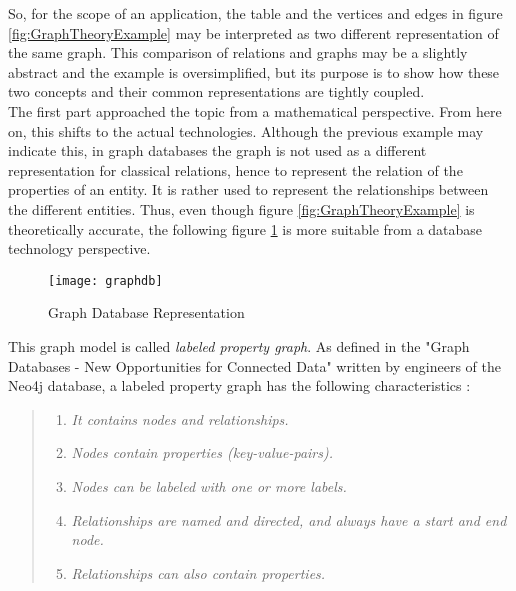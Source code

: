 So, for the scope of an application, the table and the vertices and edges in figure \ref{fig:GraphTheoryExample} may be interpreted as two different representation of the same graph. This comparison of relations and graphs may be a slightly abstract and the example is oversimplified, but its purpose is to show how these two concepts and their common representations are tightly coupled.\\

The first part approached the topic from a mathematical perspective. From here on, this shifts to the actual technologies. Although the previous example may indicate this, in graph databases the graph is not used as a different representation for classical relations, hence to represent the relation of the properties of an entity. It is rather used to represent the relationships between the different entities. Thus, even though figure \ref{fig:GraphTheoryExample} is theoretically accurate, the following figure \ref{fig:GraphDBExample} is more suitable from a database technology perspective.

\begin{figure}[H]
	\centering
	\texttt{[image: graphdb]}
	\caption[Graph Database Representation]{Graph Database Representation }
	\label{fig:GraphDBExample}
\end{figure}

This graph model is called \emph{labeled property graph}. As defined in the "Graph Databases - New Opportunities for Connected Data" written by engineers of the Neo4j database, a labeled property graph has the following characteristics \cite{neo4j}:

\begin{quote}
	\begin{enumerate}
		\item\textit{It contains nodes and relationships. }
		\item\textit{Nodes contain properties (key-value-pairs). }
		\item\textit{Nodes can be labeled with one or more labels. }
		\item\textit{Relationships are named and directed, and always have a start and end node. }
		\item\textit{Relationships can also contain properties. }
	\end{enumerate}
\end{quote}

